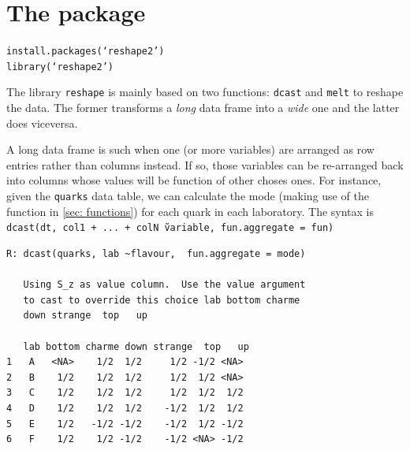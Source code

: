 \chapter{The  package}\label{sec: reshape2}
\texttt{install.packages(`reshape2')}\\
\texttt{library(`reshape2')}
\bigskip 

The library \texttt{reshape} is mainly based on 
two functions: \texttt{dcast} and \texttt{melt} to
reshape the data. The former transforms a \emph{long}
data frame into a \emph{wide} one and the latter
does viceversa.
\bigskip

A long data frame is such when one (or more variables)
are arranged as row entries rather than columns instead.
If so, those variables can be re-arranged back into 
columns whose values will be function of other choses ones.
For instance, given the \texttt{quarks} data table, we can
calculate the mode (making use of the function in 
\ref{sec: functions}) for each quark in each laboratory.
The syntax is 
\texttt{dcast(dt, col1 + ... + colN \~ variable, fun.aggregate = fun)} 
\begin{verbatim}
R: dcast(quarks, lab ~flavour,  fun.aggregate = mode)
   
   Using S_z as value column.  Use the value argument 
   to cast to override this choice lab bottom charme 
   down strange  top   up

   lab bottom charme down strange  top   up
1   A   <NA>    1/2  1/2     1/2 -1/2 <NA>
2   B    1/2    1/2  1/2     1/2  1/2 <NA>
3   C    1/2    1/2  1/2     1/2  1/2  1/2
4   D    1/2    1/2  1/2    -1/2  1/2  1/2
5   E    1/2   -1/2 -1/2    -1/2  1/2 -1/2
6   F    1/2    1/2 -1/2    -1/2 <NA> -1/2
\end{verbatim}

